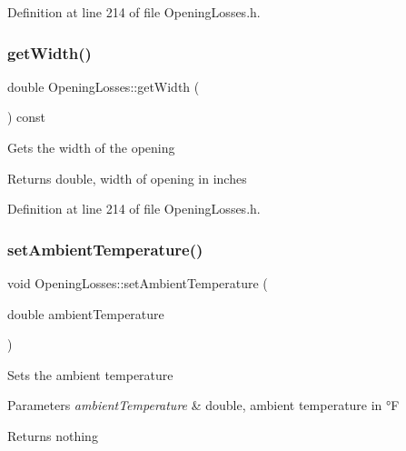 Definition at line 214 of file Opening\+Losses.\+h.

\mbox{\label{class_opening_losses_a0374aeac5532188358b5f6ad0f120305}} 
\subsubsection{\texorpdfstring{get\+Width()}{getWidth()}\hspace{0.1cm}{\footnotesize\ttfamily [3/3]}}
{\footnotesize\ttfamily double Opening\+Losses\+::get\+Width (\begin{DoxyParamCaption}{ }\end{DoxyParamCaption}) const\hspace{0.3cm}{\ttfamily [inline]}}

Gets the width of the opening

\begin{DoxyReturn}{Returns}
double, width of opening in inches 
\end{DoxyReturn}


Definition at line 214 of file Opening\+Losses.\+h.

\mbox{\label{class_opening_losses_a3624c9fad2a413871b7324f7e957a5ae}} 
\subsubsection{\texorpdfstring{set\+Ambient\+Temperature()}{setAmbientTemperature()}\hspace{0.1cm}{\footnotesize\ttfamily [1/3]}}
{\footnotesize\ttfamily void Opening\+Losses\+::set\+Ambient\+Temperature (\begin{DoxyParamCaption}\item[{double}]{ambient\+Temperature }\end{DoxyParamCaption})\hspace{0.3cm}{\ttfamily [inline]}}

Sets the ambient temperature


\begin{DoxyParams}{Parameters}
{\em ambient\+Temperature} & double, ambient temperature in °F\\
\hline
\end{DoxyParams}
\begin{DoxyReturn}{Returns}
nothing 
\end{DoxyReturn}


